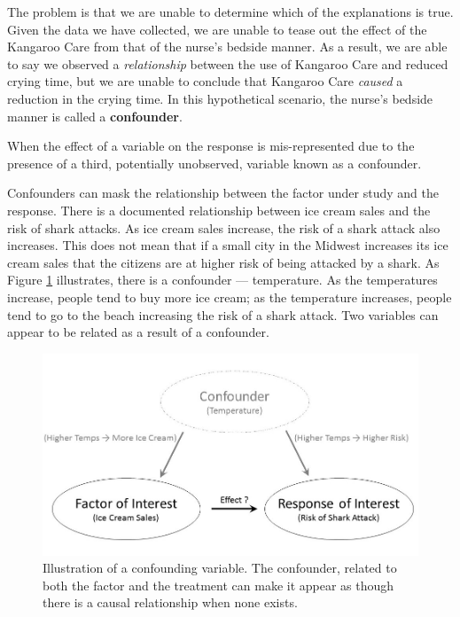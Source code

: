 \documentclass[]{book}
\theoremstyle{definition}
\theoremstyle{definition}
\theoremstyle{definition}
\theoremstyle{remark}
\let\BeginKnitrBlock\begin \let\EndKnitrBlock\end
\begin{document}
The problem is that we are unable to determine which of the explanations
is true. Given the data we have collected, we are unable to tease out
the effect of the Kangaroo Care from that of the nurse's bedside manner.
As a result, we are able to say we observed a \emph{relationship}
between the use of Kangaroo Care and reduced crying time, but we are
unable to conclude that Kangaroo Care \emph{caused} a reduction in the
crying time. In this hypothetical scenario, the nurse's bedside manner
is called a \textbf{confounder}.

\BeginKnitrBlock{definition}[Confounding]
\protect\hypertarget{def:defn-confounding}{}{\label{def:defn-confounding}
{} }When the effect of a variable on the
response is mis-represented due to the presence of a third, potentially
unobserved, variable known as a confounder.
\EndKnitrBlock{definition}

Confounders can mask the relationship between the factor under study and
the response. There is a documented relationship between ice cream sales
and the risk of shark attacks. As ice cream sales increase, the risk of
a shark attack also increases. This does not mean that if a small city
in the Midwest increases its ice cream sales that the citizens are at
higher risk of being attacked by a shark. As Figure
\ref{fig:data-confounding} illustrates, there is a confounder ---
temperature. As the temperatures increase, people tend to buy more ice
cream; as the temperature increases, people tend to go to the beach
increasing the risk of a shark attack. Two variables can appear to be
related as a result of a confounder.

\begin{figure}

{\centering \includegraphics[width=0.8\linewidth]{./images/Data-Confounding} 

}

\caption{Illustration of a confounding variable. The confounder, related to both the factor and the treatment can make it appear as though there is a causal relationship when none exists.}\label{fig:data-confounding}
\end{figure}
\end{document}
